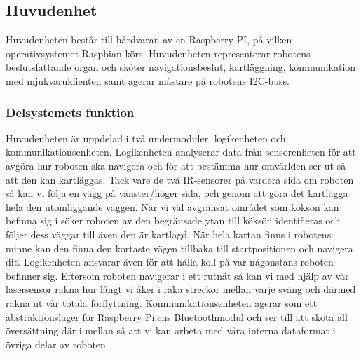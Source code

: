 \documentclass{article}
\begin{document}
\subsection{Huvudenhet}
Huvudenheten består till hårdvaran av en Raspberry PI, på vilken operativsystemet Raspbian körs.
Huvudenheten representerar robotens beslutsfattande organ och sköter navigationsbeslut, kartläggning, 
kommunikation med mjukvaruklienten samt agerar mästare på robotens I2C-buss. 

\subsubsection{Delsystemets funktion}
Huvudenheten är uppdelad i två undermoduler, logikenheten och kommunikationsenheten. Logikenheten analyserar data från sensorenheten för att avgöra hur roboten ska navigera och för att bestämma hur omvärlden ser ut så att den kan kartläggas. Tack vare de två IR-sensorer på vardera sida om roboten så kan vi följa en vägg på vänster/höger sida, och genom att göra det kartlägga hela den utomliggande väggen. När vi väl avgränsat området som köksön kan befinna sig i söker roboten av den begränsade ytan till köksön identifieras och följer dess väggar till även den är kartlagd. När hela kartan finns i robotens minne kan den finna den kortaste vägen tillbaka till startpositionen och navigera dit. Logikenheten ansvarar även för att hålla koll på var någonstans roboten befinner sig. Eftersom roboten navigerar i ett rutnät så kan vi med hjälp av vår lasersensor räkna hur långt vi åker i raka streckor mellan varje sväng och därmed räkna ut vår totala förflyttning. Kommunikationsenheten agerar som ett abstraktionslager för Raspberry Pi:ens Bluetoothmodul och ser till att sköta all översättning där i mellan så att vi kan arbeta med våra interna dataformat i övriga delar av roboten.
\end{document}
